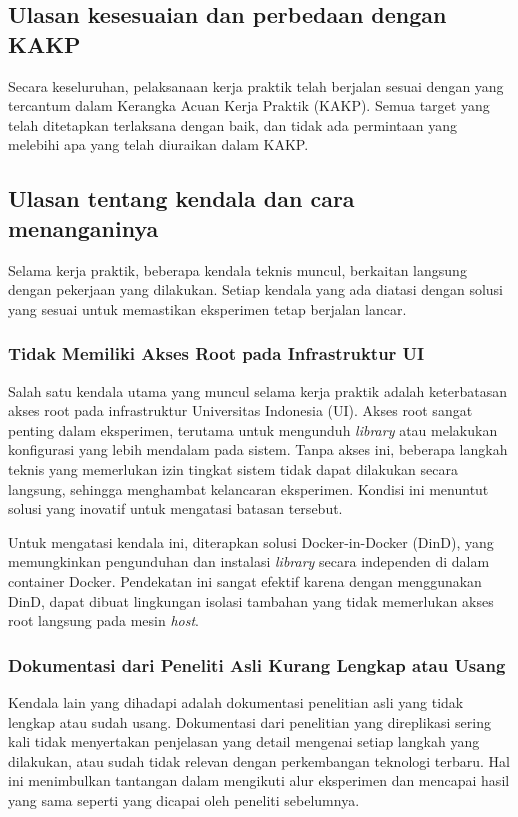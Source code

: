 \subsection{Ulasan kesesuaian dan perbedaan dengan KAKP}

Secara keseluruhan, pelaksanaan kerja praktik telah berjalan sesuai dengan yang tercantum dalam Kerangka Acuan Kerja Praktik (KAKP). Semua target yang telah ditetapkan terlaksana dengan baik, dan tidak ada permintaan yang melebihi apa yang telah diuraikan dalam KAKP.

\subsection{Ulasan tentang kendala dan cara menanganinya}

Selama kerja praktik, beberapa kendala teknis muncul, berkaitan langsung dengan pekerjaan yang dilakukan. Setiap kendala yang ada diatasi dengan solusi yang sesuai untuk memastikan eksperimen tetap berjalan lancar.

\subsubsection{Tidak Memiliki Akses Root pada Infrastruktur UI}

Salah satu kendala utama yang muncul selama kerja praktik adalah keterbatasan akses root pada infrastruktur Universitas Indonesia (UI). Akses root sangat penting dalam eksperimen, terutama untuk mengunduh \textit{library} atau melakukan konfigurasi yang lebih mendalam pada sistem. Tanpa akses ini, beberapa langkah teknis yang memerlukan izin tingkat sistem tidak dapat dilakukan secara langsung, sehingga menghambat kelancaran eksperimen. Kondisi ini menuntut solusi yang inovatif untuk mengatasi batasan tersebut.

Untuk mengatasi kendala ini, diterapkan solusi Docker-in-Docker (DinD), yang memungkinkan pengunduhan dan instalasi \textit{library} secara independen di dalam container Docker. Pendekatan ini sangat efektif karena dengan menggunakan DinD, dapat dibuat lingkungan isolasi tambahan yang tidak memerlukan akses root langsung pada mesin \textit{host}.

\subsubsection{Dokumentasi dari Peneliti Asli Kurang Lengkap atau Usang}

Kendala lain yang dihadapi adalah dokumentasi penelitian asli yang tidak lengkap atau sudah usang. Dokumentasi dari penelitian yang direplikasi sering kali tidak menyertakan penjelasan yang detail mengenai setiap langkah yang dilakukan, atau sudah tidak relevan dengan perkembangan teknologi terbaru. Hal ini menimbulkan tantangan dalam mengikuti alur eksperimen dan mencapai hasil yang sama seperti yang dicapai oleh peneliti sebelumnya.

